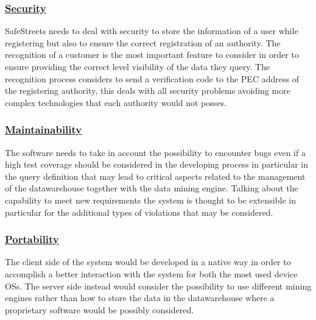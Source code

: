 		\subsubsection[Security]{\hyperlink{toc}{Security}}
			SafeStreets needs to deal with security to store the information of a user while registering but also to ensure the correct registration of an authority. The recognition of a customer is the most important feature to consider in order to ensure providing the correct level visibility of the data they query. The recognition process considers to send a verification code to the PEC address of the registering authority, this deals with all security problems avoiding more complex technologies that each authority would not posses.
		\subsubsection[Maintainability]{\hyperlink{toc}{Maintainability}}
			The software needs to take in account the possibility to encounter bugs even if a high test coverage should be considered in the developing process in particular in the query definition that may lead to critical aspects related to the management of the datawarehouse together with the data mining engine. Talking about the capability to meet new requirements the system is thought to be extensible in particular for the additional types of violations that may be considered. 
		\subsubsection[Portability]{\hyperlink{toc}{Portability}}
			The client side of the system would be developed in a native way in order to accomplish a better interaction with the system for both the most used device OSs. The server side instead would consider the possibility to use different mining engines rather than how to store the data in the datawarehouse where a proprietary software would be possibly considered.
